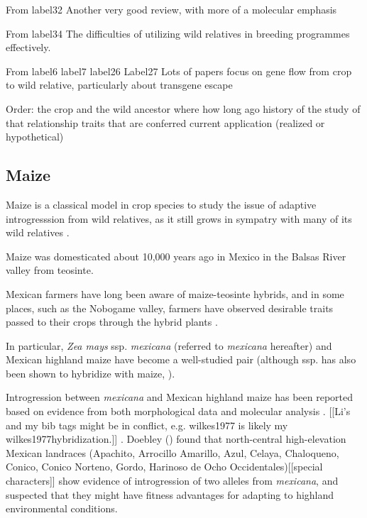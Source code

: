 \documentclass[11pt]{article}
\begin{document}
From {label32}
Another very good review, with more of a molecular emphasis

From {label34}
The difficulties of utilizing wild relatives in breeding programmes effectively.

From {label6} {label7} {label26} {Label27}
Lots of papers focus on gene flow from crop to wild relative, particularly about transgene escape




Order:
the crop and the wild ancestor
    where
    how long ago
history of the study of that relationship
traits that are conferred
current application (realized or hypothetical)



\subsection*{Maize}

Maize is a classical model in crop species to study the issue of adaptive introgresssion from wild relatives, as it still grows in sympatry with many of its wild relatives \cite{hufford2013}.

Maize was domesticated about 10,000 years ago in Mexico \cite{smith1997initial} \cite{hufford2012comparative} in the Balsas River valley \cite {matsuoka2002single} from teosinte.

Mexican farmers have long been aware of maize-teosinte hybrids, and in some places, such as the Nobogame valley, farmers have observed desirable traits passed to their crops through the hybrid plants \cite{wilkes1977hybridization} \cite{lumholtz1902unknown} \cite{wilkes1970teosinte}.

In particular, \emph{Zea mays} ssp. \emph{mexicana} (referred to \emph{mexicana} hereafter) and Mexican highland maize have become a well-studied pair (although ssp.  has also been shown to hybridize with maize, \cite{wilkes1977hybridization}).

Introgression between \emph{mexicana} and Mexican highland maize has been reported based on evidence from both morphological data \cite{wilkes1977, lauter2004, doebley1984} and molecular analysis \cite{matsuoka2002, vanHeerwaarden2011, doebley1987, warburton2011, fukunaga2005}. [[Li's and my bib tags might be in conflict, e.g. wilkes1977 is likely my wilkes1977hybridization.]]
.
 Doebley (\cite{doebley1987patterns}) found that north-central high-elevation Mexican landraces (Apachito, Arrocillo Amarillo, Azul, Celaya, Chaloqueno, Conico, Conico Norteno, Gordo, Harinoso de Ocho Occidentales)[[special characters]] show evidence of introgression of two alleles from \emph{mexicana}, and suspected that they might have fitness advantages for adapting to highland environmental conditions.
\end{document}
